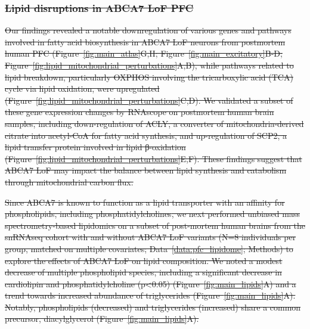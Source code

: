 \subsubsection{\sout{Lipid disruptions in ABCA7 LoF PFC}}
\sout{Our findings revealed a notable downregulation of various genes and pathways involved in fatty acid biosynthesis in ABCA7 LoF neurons from postmortem human PFC (Figure~\ref{fig:main_atlas}G,H; Figure~\ref{fig:main_excitatory}B-D; Figure~\ref{fig:lipid_mitochondrial_perturbations}A,B), while pathways related to lipid breakdown, particularly OXPHOS involving the tricarboxylic acid (TCA) cycle via lipid oxidation, were upregulated (Figure~\ref{fig:lipid_mitochondrial_perturbations}C,D). We validated a subset of these gene expression changes by RNAscope on postmortem human brain samples, including down-regulation of ACLY, a converter of mitochondria-derived citrate into acetyl-CoA for fatty acid synthesis, and up-regulation of SCP2, a lipid transfer protein involved in lipid β-oxidation (Figure~\ref{fig:lipid_mitochondrial_perturbations}E,F). These findings suggest that ABCA7 LoF may impact the balance between lipid synthesis and catabolism through mitochondrial carbon flux.}

\sout{Since ABCA7 is known to function as a lipid transporter with an affinity for phospholipids, including phosphatidylcholines\cite{Tomioka2017-nv,Picataggi2022-yp}, we next performed unbiased mass spectrometry-based lipidomics on a subset of post-mortem human brains from the snRNAseq cohort with and without ABCA7 LoF variants (N=8 individuals per group, matched on multiple covariates; Data~\ref{data:pfc_lipidome}; Methods) to explore the effects of ABCA7 LoF on lipid composition. We noted a modest decrease of multiple phospholipid species, including a significant decrease in cardiolipin and phosphatidylcholine (p<0.05) (Figure~\ref{fig:main_lipids}A) and a trend towards increased  abundance of triglycerides (Figure~\ref{fig:main_lipids}A). Notably, phospholipids (decreased) and triglycerides (increased) share a common precursor, diacylglycerol (Figure~\ref{fig:main_lipids}A).} 

